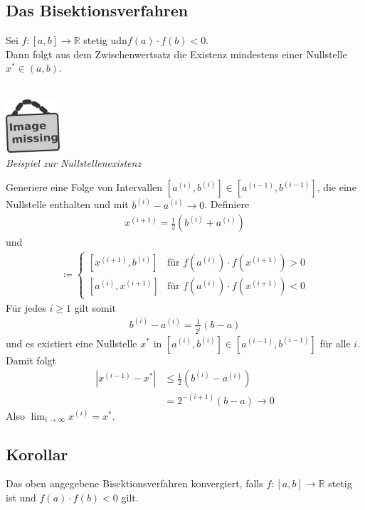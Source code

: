 \documentclass[ngerman,fontsize=11pt, paper=a4, parskip=half, titlepage=true, toc=bib]{scrbook}
\newcommand{\R}{\mathds{R}}
\newcommand{\imagemissing}[1]{
  \begin{center}~\\
    \centering 
    \includegraphics[width=2cm]{images/image_missing.jpg}\\
    \textit{#1} \\
  \end{center}
}
\begin{document}
  \subsection{Das Bisektionsverfahren}
  Sei $f:[a,b]\rightarrow \R $ stetig udn$f(a) \cdot f(b) <0$.\\
  Dann folgt aus dem Zwischenwertsatz die Existenz
  mindestens einer Nullstelle $x^{*}\in (a,b)$.
  
  \imagemissing{Beispiel zur Nullstellenexistenz}
  
  Generiere eine Folge von Intervallen
  $[a^{(i)}, b^{(i)}]\in  [a^{(i-1)}, b^{(i-1)}] $,
  die eine Nullstelle enthalten und mit $b^{(i)}-a^{(i)} \longrightarrow 0$.
  Definiere
  \begin{gather}
    x^{(i+1)}= \frac{1}{2}(b^{(i)}+a^{(i)})
    \label{V.1.1}
  \end{gather}
  und
  \begin{gather}
    [a^{(i+1)}, b^{(i+1)}] \coloneqq \begin{cases}
      [x^{(i+1)}, b^{(i)}] & \text{für } f(a^{(i)})\cdot f(x^{(i+1)}) > 0 \\
      [a^{(i)}, x^{(i+1)}] & \text{für } f(a^{(i)})\cdot f(x^{(i+1)}) < 0
    \end{cases}
    \label{V.1.2}
  \end{gather}
  Für jedes $i\geq 1$ gilt somit
  \begin{gather*}
    b^{(i)}-a^{(i)} = \frac{1}{2^i}(b-a)
  \end{gather*}
  und es existiert eine Nullstelle $x^{*}$ in $[a^{(i)}, b^{(i)}]\in  [a^{(i-1)}, b^{(i-1)}] $
  für alle $i$. \\
  Damit folgt
  \begin{align*}
    |x^{(i-1)}-x^{*}| &\leq \frac{1}{2}(b^{(i)}-a^{(i)}) \\
                      &=  2^{-(i+1)} (b-a) \longrightarrow 0
  \end{align*}
  Also $\lim_{i\rightarrow \infty}x^{(i)} = x^{*}$.
  
  
  \subsection{Korollar}
  Das oben angegebene Bisektionsverfahren konvergiert, falls
  $f:[a,b]\rightarrow \R $ stetig ist und 
  $f(a)\cdot f(b) <0$ gilt.
  
\end{document}
